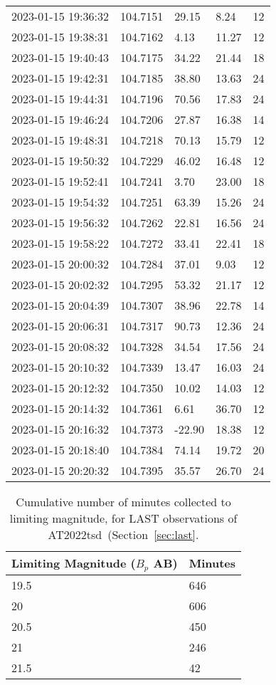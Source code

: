 \documentclass{nature_plusfigure}
\newcommand{\at}{AT2022tsd}
\begin{document}
\begin{supplement}
\begin{center}
\begin{longtable}{lllll}
2023-01-15 19:36:32 & 104.7151 & 29.15 & 8.24 & 12 \\ 
2023-01-15 19:38:31 & 104.7162 & 4.13 & 11.27 & 12 \\ 
2023-01-15 19:40:43 & 104.7175 & 34.22 & 21.44 & 18 \\ 
2023-01-15 19:42:31 & 104.7185 & 38.80 & 13.63 & 24 \\ 
2023-01-15 19:44:31 & 104.7196 & 70.56 & 17.83 & 24 \\ 
2023-01-15 19:46:24 & 104.7206 & 27.87 & 16.38 & 14 \\ 
2023-01-15 19:48:31 & 104.7218 & 70.13 & 15.79 & 12 \\ 
2023-01-15 19:50:32 & 104.7229 & 46.02 & 16.48 & 12 \\ 
2023-01-15 19:52:41 & 104.7241 & 3.70 & 23.00 & 18 \\ 
2023-01-15 19:54:32 & 104.7251 & 63.39 & 15.26 & 24 \\ 
2023-01-15 19:56:32 & 104.7262 & 22.81 & 16.56 & 24 \\ 
2023-01-15 19:58:22 & 104.7272 & 33.41 & 22.41 & 18 \\ 
2023-01-15 20:00:32 & 104.7284 & 37.01 & 9.03 & 12 \\ 
2023-01-15 20:02:32 & 104.7295 & 53.32 & 21.17 & 12 \\ 
2023-01-15 20:04:39 & 104.7307 & 38.96 & 22.78 & 14 \\ 
2023-01-15 20:06:31 & 104.7317 & 90.73 & 12.36 & 24 \\ 
2023-01-15 20:08:32 & 104.7328 & 34.54 & 17.56 & 24 \\ 
2023-01-15 20:10:32 & 104.7339 & 13.47 & 16.03 & 24 \\ 
2023-01-15 20:12:32 & 104.7350 & 10.02 & 14.03 & 12 \\ 
2023-01-15 20:14:32 & 104.7361 & 6.61 & 36.70 & 12 \\ 
2023-01-15 20:16:32 & 104.7373 & -22.90 & 18.38 & 12 \\ 
2023-01-15 20:18:40 & 104.7384 & 74.14 & 19.72 & 20 \\ 
2023-01-15 20:20:32 & 104.7395 & 35.57 & 26.70 & 24 \\ 
\hline 
\end{longtable} 
\end{center} 



\begin{table}
    \centering
    \begin{tabular}{ll}
    \hline \hline
 Limiting Magnitude ($B_p$ AB) & Minutes \\
    \hline
         19.5    &      646\\
           20    &      606\\
         20.5    &      450\\
           21     &     246\\
         21.5     &      42   \\
         \hline
   \end{tabular}
\caption{Cumulative number of minutes collected to limiting magnitude, for LAST observations of \at\ (Section~\ref{sec:last}.}
\label{tab:last-maglim}
\end{table}


\end{supplement}
\end{document}
